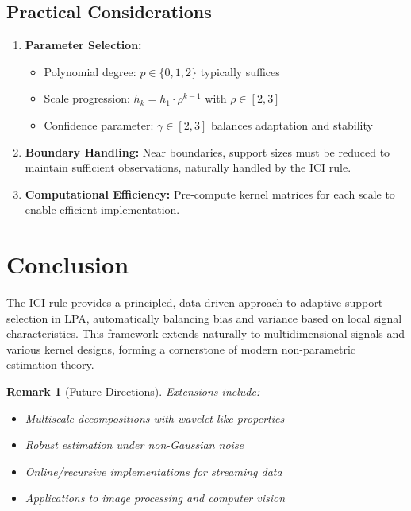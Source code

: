 \documentclass[12pt]{article}
\newtheorem{remark}[theorem]{Remark}
\begin{document}
\subsection{Practical Considerations}

\begin{enumerate}
    \item \textbf{Parameter Selection:}
          \begin{itemize}
              \item Polynomial degree: $p \in \{0, 1, 2\}$ typically suffices
              \item Scale progression: $h_k = h_1 \cdot \rho^{k-1}$ with $\rho \in [2, 3]$
              \item Confidence parameter: $\gamma \in [2, 3]$ balances adaptation and stability
          \end{itemize}

    \item \textbf{Boundary Handling:}
          Near boundaries, support sizes must be reduced to maintain sufficient observations, naturally handled by the ICI rule.

    \item \textbf{Computational Efficiency:}
          Pre-compute kernel matrices for each scale to enable efficient implementation.
\end{enumerate}

\section{Conclusion}

The ICI rule provides a principled, data-driven approach to adaptive support selection in LPA, automatically balancing bias and variance based on local signal characteristics. This framework extends naturally to multidimensional signals and various kernel designs, forming a cornerstone of modern non-parametric estimation theory.

\begin{remark}[Future Directions]
    Extensions include:
    \begin{itemize}
        \item Multiscale decompositions with wavelet-like properties
        \item Robust estimation under non-Gaussian noise
        \item Online/recursive implementations for streaming data
        \item Applications to image processing and computer vision
    \end{itemize}
\end{remark}
\end{document}
